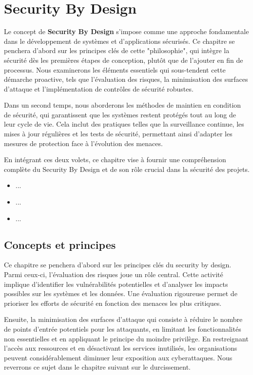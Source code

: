 \section{Security By Design}

Le concept de \textbf{Security By Design} s'impose comme une approche fondamentale dans le développement de systèmes et d'applications sécurisés. Ce chapitre se penchera d'abord sur les principes clés de cette "philosophie", qui intègre la sécurité dès les premières étapes de conception, plutôt que de l'ajouter en fin de processus. Nous examinerons les éléments essentiels qui sous-tendent cette démarche proactive, tels que l'évaluation des risques, la minimisation des surfaces d'attaque et l'implémentation de contrôles de sécurité robustes.

Dans un second temps, nous aborderons les méthodes de maintien en condition de sécurité, qui garantissent que les systèmes restent protégés tout au long de leur cycle de vie. Cela inclut des pratiques telles que la surveillance continue, les mises à jour régulières et les tests de sécurité, permettant ainsi d'adapter les mesures de protection face à l'évolution des menaces. 

En intégrant ces deux volets, ce chapitre vise à fournir une compréhension complète du Security By Design et de son rôle crucial dans la sécurité des projets.

\begin{itemize}
    \item ...
    \item ...
    \item ...
\end{itemize}

\subsection{Concepts et principes}

Ce chapitre se penchera d'abord sur les principes clés du security by design. Parmi ceux-ci, l'évaluation des risques joue un rôle central. 
Cette activité implique d'identifier les vulnérabilités potentielles et d'analyser les impacts possibles sur les systèmes et les données. Une évaluation rigoureuse permet de prioriser les efforts de sécurité en fonction des menaces les plus critiques.

Ensuite, la minimisation des surfaces d'attaque qui consiste à réduire le nombre de points d'entrée potentiels pour les attaquants, en limitant les fonctionnalités non essentielles et en appliquant le principe du moindre privilège. En restreignant l'accès aux ressources et en désactivant les services inutilisés, les organisations peuvent considérablement diminuer leur exposition aux cyberattaques. Nous reverrons ce sujet dans le chapitre suivant sur le durcissement.

